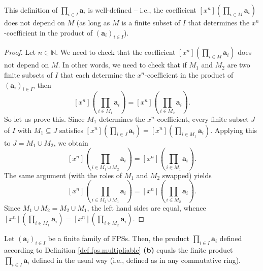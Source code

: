 \begin{proposition}
\label{prop.fps.multipliable.prod-wd}
\leantarget
\leanok
This definition of $\prod_{i\in I}\mathbf{a}_{i}$ is well-defined -- i.e., the
coefficient $\left[x^{n}\right]\left(\prod_{i\in M}\mathbf{a}_{i}\right)$ does
not depend on $M$ (as long as $M$ is a finite subset of $I$ that determines the
$x^{n}$-coefficient in the product of
$\left(\mathbf{a}_{i}\right)_{i\in I}$).
\end{proposition}

\begin{proof}
Let $n\in\mathbb{N}$. We need to check that the coefficient
$\left[x^{n}\right]\left(\prod_{i\in M}\mathbf{a}_{i}\right)$ does not depend
on $M$. In other words, we need to check that if $M_{1}$ and $M_{2}$ are two
finite subsets of $I$ that each determine the $x^{n}$-coefficient in the product
of $\left(\mathbf{a}_{i}\right)_{i\in I}$, then
\[
\left[x^{n}\right]\left(\prod_{i\in M_{1}}\mathbf{a}_{i}\right)
=\left[x^{n}\right]\left(\prod_{i\in M_{2}}\mathbf{a}_{i}\right).
\]
So let us prove this. Since $M_{1}$ determines the $x^{n}$-coefficient, every
finite subset $J$ of $I$ with $M_{1}\subseteq J$ satisfies
$\left[x^{n}\right]\left(\prod_{i\in J}\mathbf{a}_{i}\right)
=\left[x^{n}\right]\left(\prod_{i\in M_{1}}\mathbf{a}_{i}\right)$.
Applying this to $J=M_{1}\cup M_{2}$, we obtain
\[
\left[x^{n}\right]\left(\prod_{i\in M_{1}\cup M_{2}}\mathbf{a}_{i}\right)
=\left[x^{n}\right]\left(\prod_{i\in M_{1}}\mathbf{a}_{i}\right).
\]
The same argument (with the roles of $M_{1}$ and $M_{2}$ swapped) yields
\[
\left[x^{n}\right]\left(\prod_{i\in M_{2}\cup M_{1}}\mathbf{a}_{i}\right)
=\left[x^{n}\right]\left(\prod_{i\in M_{2}}\mathbf{a}_{i}\right).
\]
Since $M_{1}\cup M_{2}=M_{2}\cup M_{1}$, the left hand sides are equal, whence
$\left[x^{n}\right]\left(\prod_{i\in M_{1}}\mathbf{a}_{i}\right)
=\left[x^{n}\right]\left(\prod_{i\in M_{2}}\mathbf{a}_{i}\right)$.
\end{proof}

\begin{proposition}
\label{prop.fps.multipliable.prod-wd2}
\leantarget
\leanok
Let $\left(\mathbf{a}_{i}\right)_{i\in I}$ be a finite family of FPSs. Then, the
product $\prod_{i\in I}\mathbf{a}_{i}$ defined according to Definition
\ref{def.fps.multipliable} \textbf{(b)} equals the finite product
$\prod_{i\in I}\mathbf{a}_{i}$ defined in the usual way (i.e., defined as in any
commutative ring).
\end{proposition}

